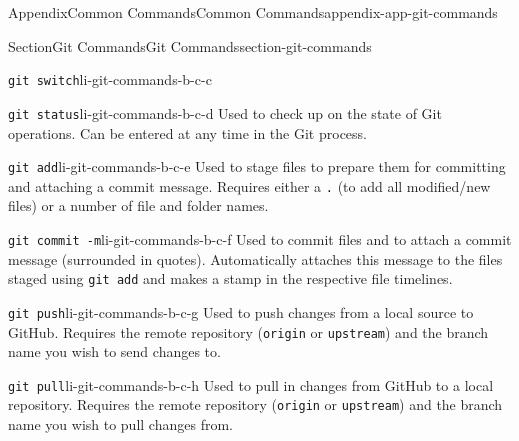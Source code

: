 \documentclass[oneside,10pt,]{book}
\newcommand{\mono}[1]{\texttt{#1}}
\begin{document}
\begin{appendixptx}{Appendix}{Common Commands}{}{Common Commands}{}{}{appendix-app-git-commands}
\begin{sectionptx}{Section}{Git Commands}{}{Git Commands}{}{}{section-git-commands}
\begin{descriptionlist}
\begin{dlimedium}{\mono{git switch}}{li-git-commands-b-c-c}
\end{dlimedium}%
\begin{dlimedium}{\mono{git status}}{li-git-commands-b-c-d}%
Used to check up on the state of Git operations. Can be entered at any time in the Git process.%
\end{dlimedium}%
\begin{dlimedium}{\mono{git add}}{li-git-commands-b-c-e}%
Used to stage files to prepare them for committing and attaching a commit message. Requires either a \mono{.} (to add all modified\slash{}new files) or a number of file and folder names.%
\end{dlimedium}%
\begin{dlimedium}{\mono{git commit -m}}{li-git-commands-b-c-f}%
Used to commit files and to attach a commit message (surrounded in quotes). Automatically attaches this message to the files staged using \mono{git add} and makes a stamp in the respective file timelines.%
\end{dlimedium}%
\begin{dlimedium}{\mono{git push}}{li-git-commands-b-c-g}%
Used to push changes from a local source to GitHub. Requires the remote repository (\mono{origin} or \mono{upstream}) and the branch name you wish to send changes to.%
\end{dlimedium}%
\begin{dlimedium}{\mono{git pull}}{li-git-commands-b-c-h}%
Used to pull in changes from GitHub to a local repository. Requires the remote repository (\mono{origin} or \mono{upstream}) and the branch name you wish to pull changes from.%
\end{dlimedium}%
\end{descriptionlist}
%
\end{sectionptx}
\end{appendixptx}
%
%
\typeout{************************************************}
\typeout{************************************************}
%
\end{document}
